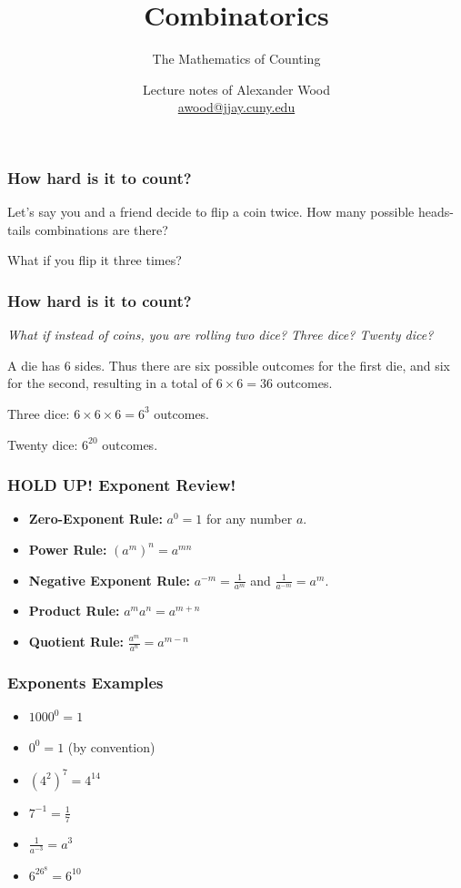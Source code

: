 \documentclass{beamer}
\title[OOP]{Combinatorics}
\subtitle{The Mathematics of Counting}
\author
{Lecture notes of Alexander Wood \\ \scriptsize \href{mailto:awood@jjay.cuny.edu}{awood@jjay.cuny.edu}}
\institute[JJay]{John Jay College of Criminal Justice}
\date{}
\newcommand{\<}{\langle}
\renewcommand{\>}{\rangle}
\begin{document}

\begin{frame}
  \titlepage
\end{frame}


\begin{frame}
\frametitle{How hard is it to count?}

Let's say you and a friend decide to flip a coin twice. How many possible heads-tails combinations are there?\newline

What if you flip it three times?
\end{frame}

\begin{frame}
\frametitle{How hard is it to count?}

\emph{What if instead of coins, you are rolling two dice? Three dice? Twenty dice?}\newline

\pause

A die has 6 sides. Thus there are six possible outcomes for the first die, and six for the second, resulting in a total of $6\times 6 = 36$ outcomes.\newline

Three dice: $6\times 6\times 6 = 6^3$ outcomes.\newline

Twenty dice: $6^{20}$ outcomes.
\end{frame}


\begin{frame}
\frametitle{HOLD UP! Exponent Review!}

\begin{itemize}
\item \textbf{Zero-Exponent Rule:} $a^0 = 1$ for any number $a$.
\item \textbf{Power Rule:} $(a^m)^n = a^{mn}$
\item \textbf{Negative Exponent Rule:} $a^{-m} = \frac{1}{a^m}$ and $\frac{1}{a^{-m}} = a^m$.
\item \textbf{Product Rule:} $a^ma^n = a^{m+n}$
\item \textbf{Quotient Rule:} $\frac{a^m}{a^n} = a^{m-n}$
\end{itemize}
\end{frame}

\begin{frame}
\frametitle{Exponents Examples}

\begin{itemize}
\item $1000^0 = 1$
\item $0^0 = 1$ (by convention)
\item $(4^2)^7 = 4^{14}$
\item $7^{-1} = \frac{1}{7}$
\item $\frac{1}{a^{-3}} = a^3$
\item $6^26^8 = 6^{10}$
\end{itemize}
\end{frame}
\end{document}
